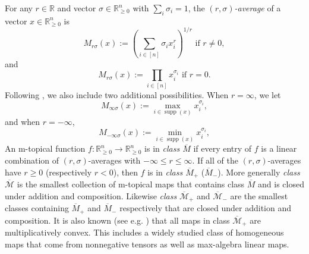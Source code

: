 \documentclass[10pt,reqno]{amsart}
\newcommand{\R}{\mathbb{R}}
\newcommand{\supp}{\operatorname{supp}}
\theoremstyle{plain}
\theoremstyle{definition}
\numberwithin{equation}{section}
\begin{document}
For any $r \in \R$ and vector $\sigma \in \R^n_{\ge 0}$ with $\sum_i \sigma_i = 1$, the \emph{$(r,\sigma)$-average} of a vector $x \in \R^n_{\ge 0}$ is 
$$M_{r\sigma}(x) := \left(\sum_{i \in [n]} \sigma_i x_i^r \right)^{1/r} \text{ if } r \ne 0,$$
and
$$M_{r\sigma}(x) := \prod_{i \in [n]} x_i^{\sigma_i} \text{ if } r = 0.$$
Following \cite[Section 5.2]{AkianGaubertHochart20}, we also include two additional possibilities. When $r = \infty$, we let 
$$M_{\infty\sigma}(x) := \max_{i \in \supp(x)} x_i^{\sigma_i},$$
and when $r = -\infty$, 
$$M_{-\infty\sigma}(x) := \min_{i \in \supp(x)} x_i^{\sigma_i},$$
An m-topical function $f:\R^n_{\ge 0} \rightarrow \R^n_{\ge 0}$ is in \emph{class $\overline{M}$} if every entry of $f$ is a linear combination of $(r, \sigma)$-averages with $-\infty \le r \le \infty$.  If all of the $(r, \sigma)$-averages have $r \ge 0$ (respectively $r < 0$), then $f$ is in \emph{class $\overline{M}_+$} ($\overline{M}_-$). More generally \emph{class} $\overline{\mathcal{M}}$ is the smallest collection of m-topical maps that contains class $\overline{M}$ and is closed under addition and composition.  Likewise \emph{class} $\overline{\mathcal{M}}_+$ and $\overline{\mathcal{M}}_-$ are the smallest classes containing $\overline{M}_+$ and $\overline{M}_-$ respectively that are closed under addition and composition.  
It is also known (see e.g. \cite[Section 7.1]{Lins23}) that all maps in class $\overline{\mathcal{M}}_+$ are multiplicatively convex.  This includes a widely studied class of homogeneous maps that come from nonnegative tensors as well as max-algebra linear maps. 
\end{document}
